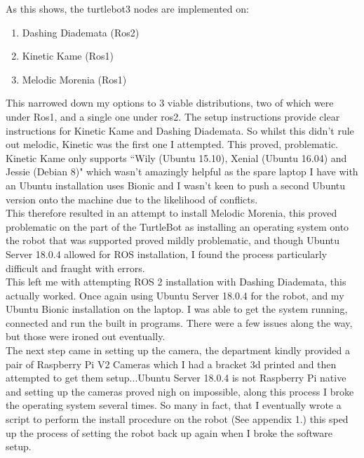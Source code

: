 \documentclass[10pt,a4paper]{report}
\begin{document}
			As this shows, the turtlebot3 nodes are implemented on: \\
			\begin{enumerate}
				\item Dashing Diademata (Ros2)
				\item Kinetic Kame (Ros1)
				\item Melodic Morenia (Ros1)
			\end{enumerate}
			This narrowed down my options to 3 viable distributions, two of which were under Ros1, and a single one under ros2. The setup instructions provide clear instructions for Kinetic Kame and Dashing Diademata. So whilst this didn't rule out melodic, Kinetic was the first one I attempted. This proved, problematic. Kinetic Kame only supports ``Wily (Ubuntu 15.10), Xenial (Ubuntu 16.04) and Jessie (Debian 8)"\cite{Kinetic_install} which wasn't amazingly helpful as the spare laptop I have with an Ubuntu installation uses Bionic and I wasn't keen to push a second Ubuntu version onto the machine due to the likelihood of conflicts. \\
			This therefore resulted in an attempt to install Melodic Morenia, this proved problematic on the part of the TurtleBot as installing an operating system onto the robot that was supported proved mildly problematic, and though Ubuntu Server 18.0.4 allowed for ROS installation, I found the process particularly difficult and fraught with errors. \\
			This left me with attempting ROS 2 installation with Dashing Diademata, this actually worked. Once again using Ubuntu Server 18.0.4 for the robot, and my Ubuntu Bionic installation on the laptop. I was able to get the system running, connected and run the built in programs. There were a few issues along the way, but those were ironed out eventually. \\
			The next step came in setting up the camera, the department kindly provided a pair of Raspberry Pi V2 Cameras which I had a bracket 3d printed and then attempted to get them setup...Ubuntu Server 18.0.4 is not Raspberry Pi native and setting up the cameras proved nigh on impossible, along this process I broke the operating system several times. So many in fact, that I eventually wrote a script to perform the install procedure on the robot (See appendix 1.) this sped up the process of setting the robot back up again when I broke the software setup.
\end{document}
